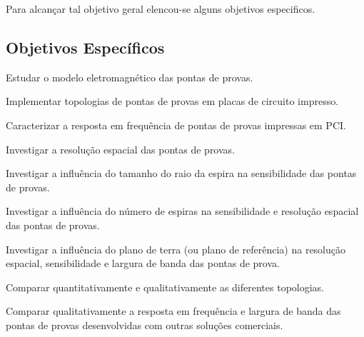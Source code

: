 
Para alcançar tal objetivo geral elencou-se alguns objetivos especificos.

\subsection{Objetivos Específicos}

\begin{alineas}
\item Estudar o modelo eletromagnético das pontas de provas.
\item Implementar topologias de pontas de provas em placas de circuito impresso.
\item Caracterizar a resposta em frequência de pontas de provas impressas em PCI.
\item Investigar a resolução espacial das pontas de provas.
\item Investigar a influência do tamanho do raio da espira na sensibilidade das pontas de provas.
\item Investigar a influência do número de espiras na sensibilidade e resolução espacial das pontas de provas.
\item Investigar a influência do plano de terra (ou plano de referência) na resolução espacial, sensibilidade e largura de banda das pontas de prova.
\item Comparar quantitativamente e qualitativamente as diferentes topologias.
\item Comparar qualitativamente a resposta em frequência e largura de banda das pontas de provas desenvolvidas com outras soluções comerciais.
\end{alineas}
